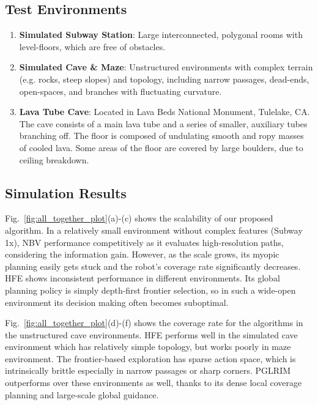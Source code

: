 \documentclass[letterpaper]{article} %
\begin{document}
\subsection{Test Environments}

\vspace{0pt}
\begin{enumerate}[label={\arabic*)}]
  \itemsep0em 
  \setlength{\itemsep}{0pt}
  \setlength{\parskip}{0pt}
  \item \textbf{Simulated Subway Station}: Large interconnected, polygonal rooms with level-floors, which are free of obstacles.
  \item \textbf{Simulated Cave \& Maze}: Unstructured environments with complex terrain (e.g. rocks, steep slopes) and topology, including narrow passages, dead-ends, open-spaces, and branches with fluctuating curvature. 
  \item \textbf{Lava Tube Cave}: Located in Lava Beds National Monument, Tulelake, CA. The cave consists of a main lava tube and a series of smaller, auxiliary tubes branching off. The floor is composed of undulating smooth and ropy masses of cooled lava. Some areas of the floor are covered by large boulders, due to ceiling breakdown.
\end{enumerate}
\vspace{-4pt}


\subsection{Simulation Results}


Fig.~\ref{fig:all_together_plot}(a)-(c) shows the scalability of our proposed algorithm. 
In a relatively small environment without complex features (Subway 1x), NBV performance competitively as it evaluates high-resolution paths, considering the information gain.
However, as the scale grows, its myopic planning easily gets stuck and the robot's coverage rate significantly decreases. 
HFE shows inconsistent performance in different environments.
Its global planning policy is simply depth-first frontier selection, so in such a wide-open environment its decision making often becomes suboptimal.
%

Fig.~\ref{fig:all_together_plot}(d)-(f) shows the coverage rate for the algorithms in the unstructured cave environments. 
HFE performs well in the simulated cave environment which has relatively simple topology, but works poorly in maze environment.
The frontier-based exploration has sparse action space, which is intrinsically brittle especially in narrow passages or sharp corners.
PGLRIM outperforms over these environments as well, thanks to its dense local coverage planning and large-scale global guidance.
\end{document}
